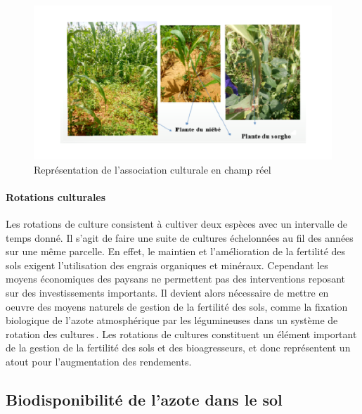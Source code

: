 \documentclass[a4paper,11pt]{article}
\begin{document}
\begin{figure}%
  \begin{center}
   \includegraphics[width=16cm]{images/AssociationChampReel}
\end{center}
\caption{Représentation de l'association culturale en champ réel}
\end{figure}

\paragraph{Rotations culturales}

Les rotations de culture consistent à cultiver deux espèces avec un
intervalle de temps donné. Il s'agit de faire une suite de cultures
échelonnées au fil des années sur une même parcelle. En effet, le
maintien et l'amélioration de la fertilité des sols exigent
l'utilisation des engrais organiques et minéraux. Cependant les moyens
économiques des paysans ne permettent pas des interventions reposant
sur des investissements importants. Il devient alors nécessaire de
mettre en oeuvre des moyens naturels de gestion de la fertilité des
sols, comme la fixation biologique de l'azote atmosphérique par les
légumineuses dans un système de rotation des
cultures\,\cite{TRAORE_2009}. Les rotations de cultures constituent un
élément important de la gestion de la fertilité des sols et des
bioagresseurs, et donc représentent un atout pour l'augmentation des
rendements.



\subsection{Biodisponibilité de l'azote dans le sol}
\end{document}
